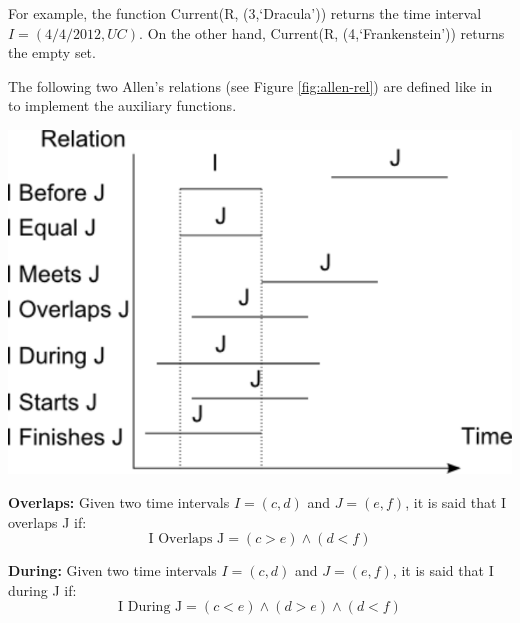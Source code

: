 For example, the function Current(R, (3,`Dracula')) returns the time interval $I = \left(4/4/2012 , UC  \right)$. On the other hand, Current(R, (4,`Frankenstein')) returns the empty set.

The following two Allen's relations (see Figure \ref{fig:allen-rel}) are defined like in~\cite{Nagypal2003} to implement the auxiliary functions. 



\vspace*{13pt}
\begin{center}
{
\includegraphics[scale=0.5]{./graphs/allen.pdf}

}
\end{center}
\vspace*{10pt}
\vspace*{13pt}


\begin{definition}
\textbf{Overlaps:}
 \label{def:overlaps}
Given two time intervals $I = \left(c, d \right)$ and $J = \left(e, f\right)$, it is said that I overlaps J if:
\begin{equation}
 \label{eqn:overlaps}
\text{I Overlaps J}  = \left(c > e  \right) \wedge \left(d < f  \right) 
\end{equation}
\end{definition}
  

\begin{definition}
\textbf{During:}
 \label{def:during}
Given two time intervals $I = \left(c, d \right)$ and $J = \left(e, f\right)$, it is said that I during J if:
\begin{equation}
 \label{eqn:during}
\text{I During J}  = \left(c < e  \right) \wedge \left(d > e  \right) \wedge \left(d < f \right)
\end{equation}
\end{definition}

